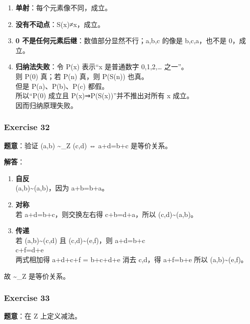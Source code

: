 \documentclass[
  11pt,
]{article}
\providecommand{\tightlist}{%
  \setlength{\itemsep}{0pt}\setlength{\parskip}{0pt}}
\begin{document}
\begin{enumerate}
\def\labelenumi{\arabic{enumi}.}
\tightlist
\item
  \textbf{单射}：每个元素像不同，成立。
\item
  \textbf{没有不动点}：S(x)≠x，成立。
\item
  \textbf{0 不是任何元素后继}：数值部分显然不行；a,b,c 的像是
  b,c,a，也不是 0，成立。
\item
  \textbf{归纳法失败}：令 P(x) 表示``x 是普通数字 0,1,2,\ldots{}
  之一''。\\
  则 P(0) 真；若 P(n) 真，则 P(S(n)) 也真。\\
  但是 P(a)、P(b)、P(c) 都假。\\
  所以``P(0) 成立且 P(x)⇒P(S(x))''并不推出对所有 x 成立。\\
  因而归纳原理失败。
\end{enumerate}

\subsubsection{Exercise 32}\label{exercise-32}

\textbf{题意}：验证 (a,b) \textasciitilde\_Z (c,d) ⇔ a+d=b+c
是等价关系。

\textbf{解答}：

\begin{enumerate}
\def\labelenumi{\arabic{enumi}.}
\item
  \textbf{自反}\\
  (a,b)\textasciitilde(a,b)，因为 a+b=b+a。
\item
  \textbf{对称}\\
  若 a+d=b+c，则交换左右得 c+b=d+a，所以 (c,d)\textasciitilde(a,b)。
\item
  \textbf{传递}\\
  若 (a,b)\textasciitilde(c,d) 且 (c,d)\textasciitilde(e,f)，则
  a+d=b+c\\
  c+f=d+e\\
  两式相加得 a+d+c+f = b+c+d+e 消去 c,d，得 a+f=b+e 所以
  (a,b)\textasciitilde(e,f)。
\end{enumerate}

故 \textasciitilde\_Z 是等价关系。

\subsubsection{Exercise 33}\label{exercise-33}

\textbf{题意}：在 Z 上定义减法。
\end{document}
